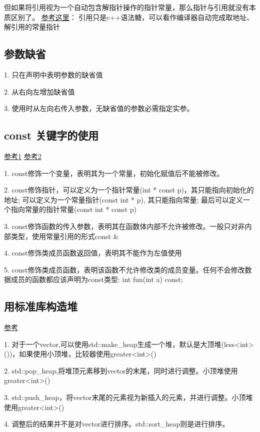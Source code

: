 但如果将引用视为一个自动包含解指针操作的指针常量，那么指针与引用就没有本质区别了。
\href{https://www.marvinle.cn/2018/12/10/pointer-reference/}{参考这里}：
引用只是c++语法糖，可以看作编译器自动完成取地址、解引用的常量指针

\subsection{参数缺省}
1. 只在声明中表明参数的缺省值

2. 从右向左增加缺省值

3. 使用时从左向右传入参数，无缺省值的参数必需指定实参。



\subsection{const 关键字的使用}
\href{https://blog.csdn.net/lf1570180470/article/details/56677748}{参考1}
\href{https://www.cnblogs.com/azbane/p/7266747.html}{参考2}

1. const修饰一个变量，表明其为一个常量，初始化赋值后不能被修改。

2. const修饰指针，可以定义为一个指针常量(int * const p)，其只能指向初始化的地址; 可以定义为一个常量指针(const int * p), 其只能指向常量; 最后可以定义一个指向常量的指针常量(const int * const p)

3. const修饰函数的传入参数，表明其在函数体内部不允许被修改。一般只对非内部类型，使用常量引用的形式const \&

4. const修饰类成员函数返回值，表明其不能作为左值使用

5. const修饰类成员函数，表明该函数不允许修改类的成员变量。任何不会修改数据成员的函数都应该声明为const类型: int fun(int a) const;

\subsection{用标准库构造堆}
\href{http://www.cplusplus.com/reference/algorithm/make_heap/?kw=make_heap}{参考}

1. 对于一个vector,可以使用std::make_heap生成一个堆，默认是大顶堆(less<int>())，如果使用小顶堆，比较器使用greater<int>()

2. std::pop_heap,将堆顶元素移到vector的末尾，同时进行调整。小顶堆使用greater<int>()

3. std::push_heap，将vector末尾的元素视为新插入的元素，并进行调整。小顶堆使用greater<int>()

4. 调整后的结果并不是对vector进行排序。std::sort_heap则是进行排序。